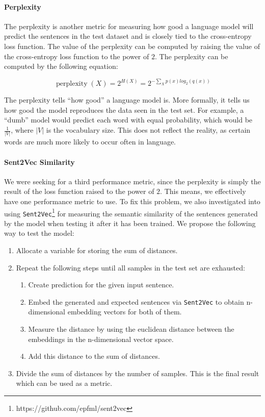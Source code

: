\paragraph{Perplexity} The perplexity is another metric for measuring how good a language model will predict the sentences in the test dataset and is closely tied to the cross-entropy loss function. The value of the perplexity can be computed by raising the value of the cross-entropy loss function to the power of $2$. The perplexity can be computed by the following equation:

\begin{equation}
\operatorname{perplexity}(X) = 2^{H(X)} = 2^{- \sum_{X} p(x) log_2(q(x))}
\end{equation}

The perplexity tells ``how good'' a language model is. More formally, it tells us how good the model reproduces the data seen in the test set. For example, a ``dumb'' model would predict each word with equal probability, which would be $\frac{1}{|V|}$, where $|V|$ is the vocabulary size. This does not reflect the reality, as certain words are much more likely to occur often in language.

\paragraph{Sent2Vec Similarity} We were seeking for a third performance metric, since the perplexity is simply the result of the loss function raised to the power of $2$. This means, we effectively have one performance metric to use. To fix this problem, we also investigated into using \texttt{Sent2Vec}\footnote{https://github.com/epfml/sent2vec} \cite{Pgj:2017} for measuring the semantic similarity of the sentences generated by the model when testing it after it has been trained. We propose the following way to test the model:

\begin{enumerate}[noitemsep]
	\item Allocate a variable for storing the sum of distances.
	\item Repeat the following steps until all samples in the test set are exhausted:
	\begin{enumerate}[noitemsep]
		\item Create prediction for the given input sentence.
		\item Embed the generated and expected sentences via \texttt{Sent2Vec} to obtain n-dimensional embedding vectors for both of them.
		\item Measure the distance by using the euclidean distance between the embeddings in the n-dimensional vector space.
		\item Add this distance to the sum of distances.
	\end{enumerate}
	\item Divide the sum of distances by the number of samples. This is the final result which can be used as a metric.
\end{enumerate}

